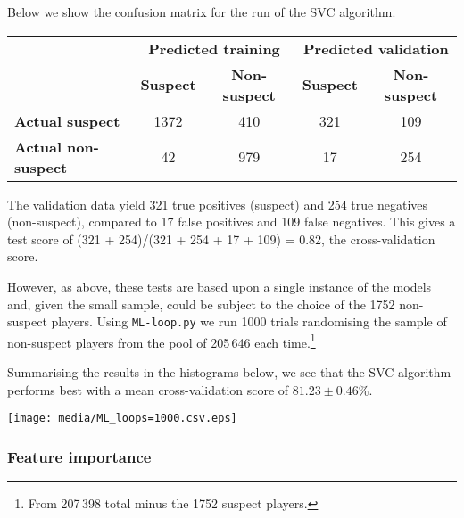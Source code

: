 \documentclass[11pt]{article} %
\begin{document}
Below we show the confusion matrix for the run of the SVC algorithm.

\begin{tabular}{@{}l  cccc  @{}}
                  & \multicolumn{2}{c}{\bf Predicted training} & \multicolumn{2}{c}{\bf Predicted validation} \\
                  & {\bf Suspect} & {\bf Non-suspect} & {\bf Suspect} & {\bf Non-suspect}\\
{\bf Actual suspect} & 1372 & 410 & 321 & 109 \\
{\bf Actual non-suspect} & 42 & 979 & 17 & 254 \\
\end{tabular}

The validation data yield 321 true positives (suspect) and 254 true negatives (non-suspect),
compared to 17 false positives 
and 109 false negatives. This gives a test score of (321 + 254)/(321 + 254 + 17 + 109) = 0.82, the cross-validation score.

However, as above, these tests are based upon a single instance of the
models and, given the small sample, could be subject to the choice of the 1752 non-suspect players.
Using {\tt ML-loop.py} we run 1000 trials randomising the sample of non-suspect players from the pool of
205\,646 each time.\footnote{From 207\,398 total minus the 1752 suspect players.}

Summarising the results in the histograms below, we see
that the SVC algorithm performs best with a mean cross-validation
score of $81.23\pm0.46$\%.

\texttt{[image: media/ML\_loops=1000.csv.eps]}

\subsubsection{Feature importance}
\label{fi}
\end{document}
